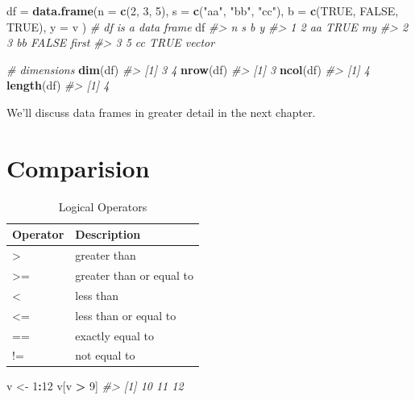 \documentclass[]{book}
\newenvironment{Shaded}{\begin{snugshade}}{\end{snugshade}}
\newcommand{\KeywordTok}[1]{\textcolor[rgb]{0.13,0.29,0.53}{\textbf{#1}}}
\newcommand{\DataTypeTok}[1]{\textcolor[rgb]{0.13,0.29,0.53}{#1}}
\newcommand{\DecValTok}[1]{\textcolor[rgb]{0.00,0.00,0.81}{#1}}
\newcommand{\StringTok}[1]{\textcolor[rgb]{0.31,0.60,0.02}{#1}}
\newcommand{\CommentTok}[1]{\textcolor[rgb]{0.56,0.35,0.01}{\textit{#1}}}
\newcommand{\OtherTok}[1]{\textcolor[rgb]{0.56,0.35,0.01}{#1}}
\newcommand{\OperatorTok}[1]{\textcolor[rgb]{0.81,0.36,0.00}{\textbf{#1}}}
\newcommand{\NormalTok}[1]{#1}
\theoremstyle{definition}
\theoremstyle{definition}
\theoremstyle{definition}
\theoremstyle{remark}
\begin{document}
\begin{Shaded}
\begin{Highlighting}[]
\NormalTok{df =}\StringTok{ }\KeywordTok{data.frame}\NormalTok{(}\DataTypeTok{n =} \KeywordTok{c}\NormalTok{(}\DecValTok{2}\NormalTok{, }\DecValTok{3}\NormalTok{, }\DecValTok{5}\NormalTok{),}
                \DataTypeTok{s =} \KeywordTok{c}\NormalTok{(}\StringTok{"aa"}\NormalTok{, }\StringTok{"bb"}\NormalTok{, }\StringTok{"cc"}\NormalTok{),}
                \DataTypeTok{b =} \KeywordTok{c}\NormalTok{(}\OtherTok{TRUE}\NormalTok{, }\OtherTok{FALSE}\NormalTok{, }\OtherTok{TRUE}\NormalTok{),}
                \DataTypeTok{y =}\NormalTok{ v}
\NormalTok{                )       }\CommentTok{# df is a data frame }
\NormalTok{df}
\CommentTok{#>   n  s     b      y}
\CommentTok{#> 1 2 aa  TRUE     my}
\CommentTok{#> 2 3 bb FALSE  first}
\CommentTok{#> 3 5 cc  TRUE vector}

\CommentTok{# dimensions}
\KeywordTok{dim}\NormalTok{(df)}
\CommentTok{#> [1] 3 4}
\KeywordTok{nrow}\NormalTok{(df)}
\CommentTok{#> [1] 3}
\KeywordTok{ncol}\NormalTok{(df)}
\CommentTok{#> [1] 4}
\KeywordTok{length}\NormalTok{(df)}
\CommentTok{#> [1] 4}
\end{Highlighting}
\end{Shaded}

We'll discuss data frames in greater detail in the next chapter.

\section{Comparision}\label{comparision}

\begin{table}

\caption{\label{tab:table-logicalOps}Logical Operators}
\centering
\begin{tabular}[t]{ll}
\toprule
Operator & Description\\
\midrule
> & greater than\\
>= & greater than or equal to\\
< & less than\\
<= & less than or equal to\\
== & exactly equal to\\
!= & not equal to\\
\bottomrule
\end{tabular}
\end{table}

\begin{Shaded}
\begin{Highlighting}[]
\NormalTok{v <-}\StringTok{ }\DecValTok{1}\OperatorTok{:}\DecValTok{12}
\NormalTok{v[v }\OperatorTok{>}\StringTok{ }\DecValTok{9}\NormalTok{]}
\CommentTok{#> [1] 10 11 12}
\end{Highlighting}
\end{Shaded}
\end{document}
